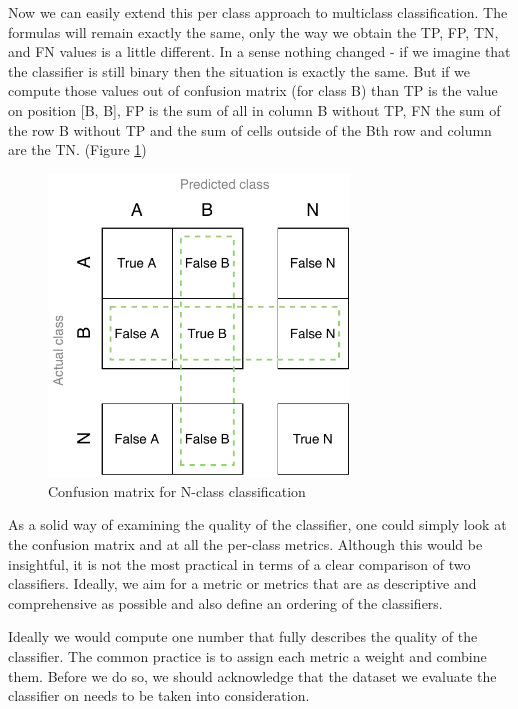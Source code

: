 Now we can easily extend this per class approach to multiclass classification. The formulas will remain exactly the same, only the way we obtain the TP, FP, TN, and FN values is a little different. In a sense nothing changed - if we imagine that the classifier is still binary then the situation is exactly the same. But if we compute those values out of confusion matrix (for class B) than TP is the value on position [B, B], FP is the sum of all in column B without TP, FN the sum of the row B without TP and the sum of cells outside of the Bth row and column are the TN. (Figure \ref{obr:BigCM})



\begin{figure}[h]\centering
\includegraphics[width=80mm]{./img//Diplomka diagramy-Big Confusion matric}
\caption{Confusion matrix for N-class classification}
\label{obr:BigCM}
\end{figure}






As a solid way of examining the quality of the classifier, one could simply look at the confusion matrix and at all the per-class metrics. Although this would be insightful, it is not the most practical in terms of a clear comparison of two classifiers. Ideally, we aim for a metric or metrics that are as descriptive and comprehensive as possible and also define an ordering of the classifiers.

Ideally we would compute one number that fully describes the quality of the classifier. The common practice is to assign each metric a weight and combine them. Before we do so, we should acknowledge that the dataset we evaluate the classifier on needs to be taken into consideration.


